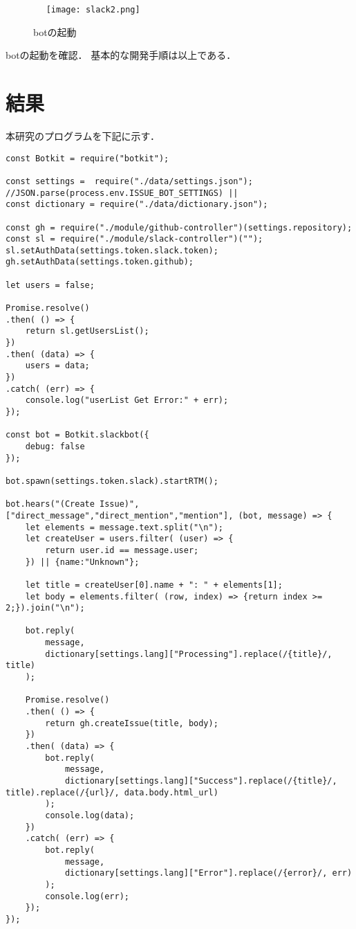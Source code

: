 \begin{figure}[htb]
\centering　
\texttt{[image: slack2.png]}
\caption{botの起動}\label{tab:botの起動}
\end{figure}
\newpage
botの起動を確認．
基本的な開発手順は以上である．




\chapter{結果}
本研究のプログラムを下記に示す．

\begin{verbatim}
const Botkit = require("botkit");

const settings =  require("./data/settings.json");
//JSON.parse(process.env.ISSUE_BOT_SETTINGS) ||
const dictionary = require("./data/dictionary.json");

const gh = require("./module/github-controller")(settings.repository);
const sl = require("./module/slack-controller")("");
sl.setAuthData(settings.token.slack.token);
gh.setAuthData(settings.token.github);

let users = false;

Promise.resolve()
.then( () => {
	return sl.getUsersList();
})
.then( (data) => {
	users = data;
})
.catch( (err) => {
	console.log("userList Get Error:" + err);
});

const bot = Botkit.slackbot({
	debug: false
});

bot.spawn(settings.token.slack).startRTM();

bot.hears("(Create Issue)",["direct_message","direct_mention","mention"], (bot, message) => {
	let elements = message.text.split("\n");
	let createUser = users.filter( (user) => {
		return user.id == message.user;
	}) || {name:"Unknown"};

	let title = createUser[0].name + ": " + elements[1];
	let body = elements.filter( (row, index) => {return index >= 2;}).join("\n");

	bot.reply(
		message,
		dictionary[settings.lang]["Processing"].replace(/{title}/, title)
	);

	Promise.resolve()
	.then( () => {
		return gh.createIssue(title, body);
	})
	.then( (data) => {
		bot.reply(
			message,
			dictionary[settings.lang]["Success"].replace(/{title}/, title).replace(/{url}/, data.body.html_url)
		);
		console.log(data);
	})
	.catch( (err) => {
		bot.reply(
			message,
			dictionary[settings.lang]["Error"].replace(/{error}/, err)
		);
		console.log(err);
	});
});

\end{verbatim}
